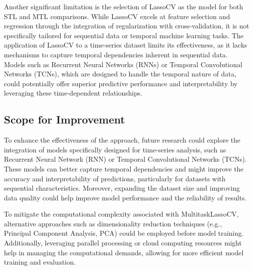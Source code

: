 Another significant limitation is the selection of LassoCV as the model for both STL and MTL comparisons. While LassoCV excels at feature selection and regression through the integration of regularization with cross-validation, it is not specifically tailored for sequential data or temporal machine learning tasks. The application of LassoCV to a time-series dataset limits its effectiveness, as it lacks mechanisms to capture temporal dependencies inherent in sequential data. Models such as Recurrent Neural Networks (RNNs) or Temporal Convolutional Networks (TCNs), which are designed to handle the temporal nature of data, could potentially offer superior predictive performance and interpretability by leveraging these time-dependent relationships.



\subsection{Scope for Improvement}

To enhance the effectiveness of the approach, future research could explore the integration of models specifically designed for time-series analysis, such as Recurrent Neural Network (RNN) or Temporal Convolutional Networks (TCNs). These models can better capture temporal dependencies and might improve the accuracy and interpretability of predictions, particularly for datasets with sequential characteristics. Moreover, expanding the dataset size and improving data quality could help improve model performance and the reliability of results.

To mitigate the computational complexity associated with MultitaskLassoCV, alternative approaches such as dimensionality reduction techniques (e.g., Principal Component Analysis, PCA) could be employed before model training. Additionally, leveraging parallel processing or cloud computing resources might help in managing the computational demands, allowing for more efficient model training and evaluation.



\def\baselinestretch{1.44}



   
\smallskip
\goodbreak








\def\baselinestretch{1.66}
\medskip


